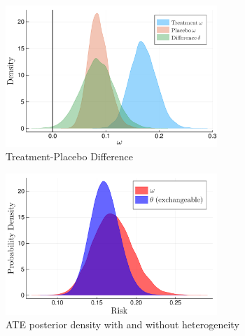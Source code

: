 \documentclass{juliacon}
\begin{document}
\begin{figure}[t]
	\centerline{\includegraphics[width=8cm]{treat_pbo_diff2.pdf}}
	\caption{Treatment-Placebo Difference}
	\label{fig:diff}
\end{figure}


\begin{table}
	\label{tab:delta_results}
\end{table}


\begin{figure}[t]
	\centerline{\includegraphics[width=8cm]{bhm_vs_exc.pdf}}
	\caption{ATE posterior density with and without heterogeneity}
	\label{fig:compare}	
\end{figure}
 
\end{document}
